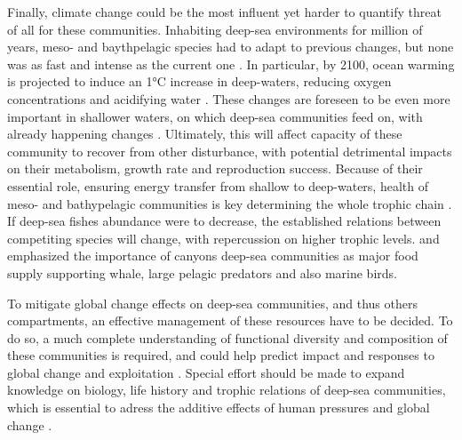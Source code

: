 Finally, climate change could be the most influent yet harder to quantify threat of all for these communities. Inhabiting deep-sea environments for million of years, meso- and baythpelagic species had to adapt to previous changes, but none was as fast and intense as the current one \citep{catul2011}. In particular, by 2100, ocean warming is projected to induce an 1°C increase in deep-waters, reducing oxygen concentrations and acidifying water \citep{danovaro2017}. These changes are foreseen to be even more important in shallower waters, on which deep-sea communities feed on, with already happening changes \citep{danovaro2017}. Ultimately, this will affect capacity of these community to recover from other disturbance, with potential detrimental impacts on their metabolism, growth rate and reproduction success. Because of their essential role, ensuring energy transfer from shallow to deep-waters, health of meso- and bathypelagic communities is key determining the whole trophic chain \citep{davison2015,gaskett2001}. If deep-sea fishes abundance were to decrease, the established relations between competiting species will change, with repercussion on higher trophic levels. \citet{aissi2012} and \citet{kenchington2020} emphasized the importance of canyons deep-sea communities as major food supply supporting whale, large pelagic predators and also marine birds. 

To mitigate global change effects on deep-sea communities, and thus others compartments, an effective management of these resources have to be decided. To do so, a much complete understanding of functional diversity and composition of these communities is required, and could help predict impact and responses to global change and exploitation \citep{carrington2021,dumay2004,kremer2017}. Special effort should be made to expand knowledge on biology, life history and trophic relations of deep-sea communities, which is essential to adress the additive effects of human pressures and global change \citep{danovaro2017}.



